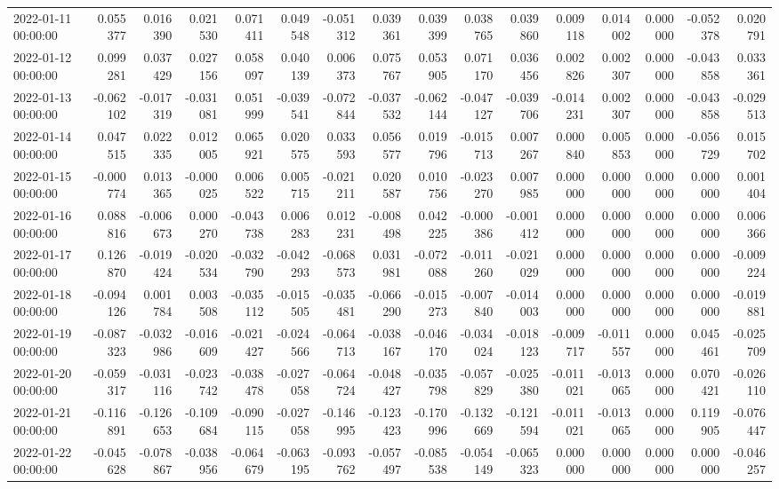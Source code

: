 \begin{tabular}{lrrrrrrrrrrrrrrr}
2022-01-11 00:00:00 & 0.055377 & 0.016390 & 0.021530 & 0.071411 & 0.049548 & -0.051312 & 0.039361 & 0.039399 & 0.038765 & 0.039860 & 0.009118 & 0.014002 & 0.000000 & -0.052378 & 0.020791 \\
2022-01-12 00:00:00 & 0.099281 & 0.037429 & 0.027156 & 0.058097 & 0.040139 & 0.006373 & 0.075767 & 0.053905 & 0.071170 & 0.036456 & 0.002826 & 0.002307 & 0.000000 & -0.043858 & 0.033361 \\
2022-01-13 00:00:00 & -0.062102 & -0.017319 & -0.031081 & 0.051999 & -0.039541 & -0.072844 & -0.037532 & -0.062144 & -0.047127 & -0.039706 & -0.014231 & 0.002307 & 0.000000 & -0.043858 & -0.029513 \\
2022-01-14 00:00:00 & 0.047515 & 0.022335 & 0.012005 & 0.065921 & 0.020575 & 0.033593 & 0.056577 & 0.019796 & -0.015713 & 0.007267 & 0.000840 & 0.005853 & 0.000000 & -0.056729 & 0.015702 \\
2022-01-15 00:00:00 & -0.000774 & 0.013365 & -0.000025 & 0.006522 & 0.005715 & -0.021211 & 0.020587 & 0.010756 & -0.023270 & 0.007985 & 0.000000 & 0.000000 & 0.000000 & 0.000000 & 0.001404 \\
2022-01-16 00:00:00 & 0.088816 & -0.006673 & 0.000270 & -0.043738 & 0.006283 & 0.012231 & -0.008498 & 0.042225 & -0.000386 & -0.001412 & 0.000000 & 0.000000 & 0.000000 & 0.000000 & 0.006366 \\
2022-01-17 00:00:00 & 0.126870 & -0.019424 & -0.020534 & -0.032790 & -0.042293 & -0.068573 & 0.031981 & -0.072088 & -0.011260 & -0.021029 & 0.000000 & 0.000000 & 0.000000 & 0.000000 & -0.009224 \\
2022-01-18 00:00:00 & -0.094126 & 0.001784 & 0.003508 & -0.035112 & -0.015505 & -0.035481 & -0.066290 & -0.015273 & -0.007840 & -0.014003 & 0.000000 & 0.000000 & 0.000000 & 0.000000 & -0.019881 \\
2022-01-19 00:00:00 & -0.087323 & -0.032986 & -0.016609 & -0.021427 & -0.024566 & -0.064713 & -0.038167 & -0.046170 & -0.034024 & -0.018123 & -0.009717 & -0.011557 & 0.000000 & 0.045461 & -0.025709 \\
2022-01-20 00:00:00 & -0.059317 & -0.031116 & -0.023742 & -0.038478 & -0.027058 & -0.064724 & -0.048427 & -0.035798 & -0.057829 & -0.025380 & -0.011021 & -0.013065 & 0.000000 & 0.070421 & -0.026110 \\
2022-01-21 00:00:00 & -0.116891 & -0.126653 & -0.109684 & -0.090115 & -0.027058 & -0.146995 & -0.123423 & -0.170996 & -0.132669 & -0.121594 & -0.011021 & -0.013065 & 0.000000 & 0.119905 & -0.076447 \\
2022-01-22 00:00:00 & -0.045628 & -0.078867 & -0.038956 & -0.064679 & -0.063195 & -0.093762 & -0.057497 & -0.085538 & -0.054149 & -0.065323 & 0.000000 & 0.000000 & 0.000000 & 0.000000 & -0.046257 \\

\end{tabular}
